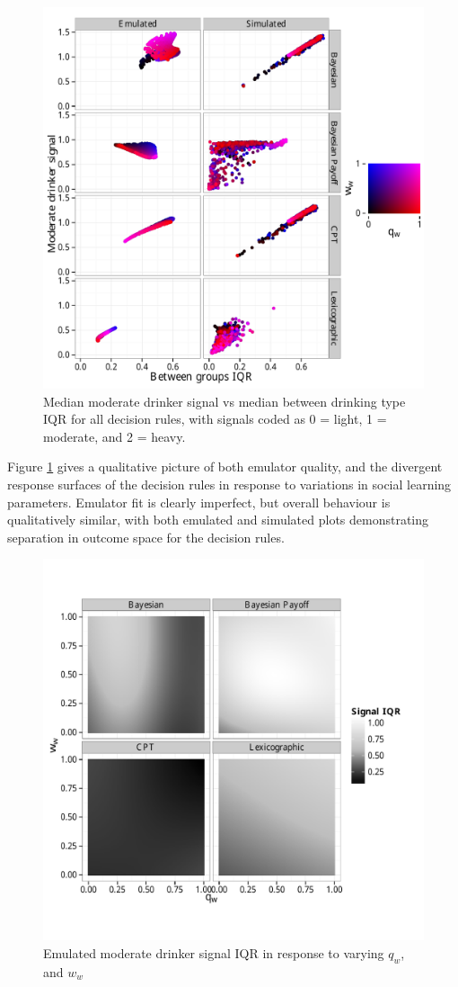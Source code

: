 \begin{figure}[h]
\includegraphics[width=119mm]{figures/sharing_emulated_simulated}
\caption{Median moderate drinker signal vs median between drinking type IQR for all decision rules, with signals coded as 0 = light, 1 = moderate, and 2 = heavy.}
\label{fig:outcome_plots}
\end{figure}

Figure \ref{fig:outcome_plots} gives a qualitative picture of both emulator quality, and the divergent response surfaces of the decision rules in response to variations in social learning parameters. Emulator fit is clearly imperfect, but overall behaviour is qualitatively similar, with both emulated and simulated plots demonstrating separation in outcome space for the decision rules.

\begin{figure}[h]
\includegraphics[width=119mm]{figures/unfixed_emu_sig_iqr}
\caption{Emulated moderate drinker signal IQR in response to varying \(q_{w}\), and \(w_{w}\)}
\label{fig:emulated_sharing_iqr}
\end{figure}

